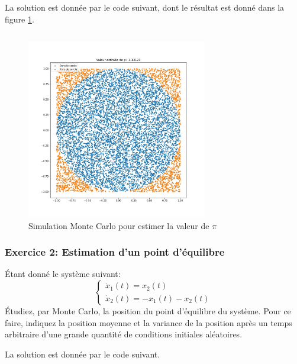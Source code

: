             La solution est donnée par le code suivant, dont le résultat est donné dans la figure \ref{fig:montecarlo_pi}.
                \inputminted{python}{codes/montecarlo_pi.py}
                \begin{figure}[!ht]
                    \centering
                    \includegraphics[width=0.7\textwidth]{images/montecarlo_pi.jpg}
                    \caption{Simulation Monte Carlo pour estimer la valeur de $\pi$}
                    \label{fig:montecarlo_pi}
                \end{figure}

        \subsubsection{Exercice 2: Estimation d'un point d'équilibre}
            Étant donné le système suivant:
            \begin{equation*}
                \begin{cases}
                    \dot{x}_1(t) = x_2(t)\\
                    \dot{x}_2(t) = -x_1(t) - x_2(t)
                \end{cases}
            \end{equation*}
            Étudiez, par Monte Carlo, la position du point d'équilibre du système. Pour ce faire, indiquez la position moyenne et la variance de la position après un temps arbitraire d'une grande quantité de conditions initiales aléatoires.
            
            La solution est donnée par le code suivant.
            \inputminted{python}{codes/montecarlo_point_d_equilibre.py}

